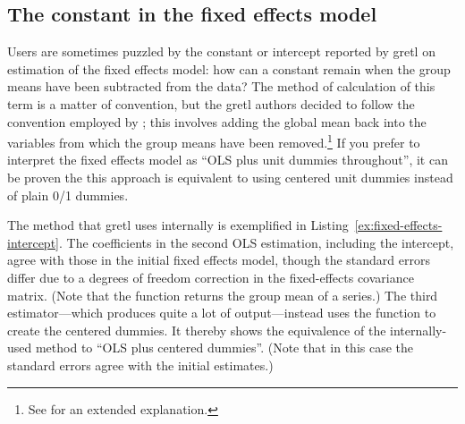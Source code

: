 \subsection{The constant in the fixed effects model}

Users are sometimes puzzled by the constant or intercept reported by
gretl on estimation of the fixed effects model: how can a constant
remain when the group means have been subtracted from the data? The
method of calculation of this term is a matter of convention, but the
gretl authors decided to follow the convention employed by
; this involves adding the global mean back into the
variables from which the group means have been removed.\footnote{See
  \cite{gould13} for an extended explanation.} If you prefer to
interpret the fixed effects model as ``OLS plus unit dummies
throughout'', it can be proven the this approach is equivalent to
using centered unit dummies instead of plain 0/1 dummies.

The method that gretl uses internally is exemplified in
Listing~\ref{ex:fixed-effects-intercept}. The coefficients in the second OLS
estimation, including the intercept, agree with those in the initial
fixed effects model, though the standard errors differ due to a
degrees of freedom correction in the fixed-effects covariance matrix.
(Note that the  function returns the group mean of a
series.) The third estimator---which produces quite a lot of
output---instead uses the  function to create the centered
dummies. It thereby shows the equivalence of the internally-used
method to ``OLS plus centered dummies''. (Note that in this case the
standard errors agree with the initial estimates.)

\begin{script}[htbp]
\end{script}


